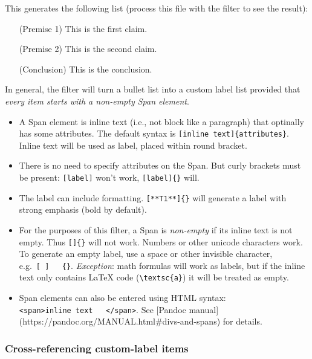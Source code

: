 This generates the following list (process this file with the filter to
see the result):

\begin{itemize}
\tightlist

\item[(Premise 1)] This is the first claim.

\item[(Premise 2)] This is the second claim.

\item[(Conclusion)] This is the conclusion.

\end{itemize}

In general, the filter will turn a bullet list into a custom label list
provided that \emph{every item starts with a non-empty Span element}.

\begin{itemize}
\tightlist
\item
  A Span element is inline text (i.e., not block like a paragraph) that
  optinally has some attributes. The default syntax is
  \texttt{{[}inline\ text{]}\{attributes\}}. Inline text will be used as
  label, placed within round bracket.
\item
  There is no need to specify attributes on the Span. But curly brackets
  must be present: \texttt{{[}label{]}} won't work,
  \texttt{{[}label{]}\{\}} will.
\item
  The label can include formatting. \texttt{{[}**T1**{]}\{\}} will
  generate a label with strong emphasis (bold by default).
\item
  For the purposes of this filter, a Span is \emph{non-empty} if its
  inline text is not empty. Thus \texttt{{[}{]}\{\}} will not work.
  Numbers or other unicode characters work. To generate an empty label,
  use a space or other invisible character,
  e.g.~\texttt{{[}\ {]}\ \ \ \{\}}. \emph{Exception}: math formulas will
  work as labels, but if the inline text only contains LaTeX code
  (\texttt{\textbackslash{}textsc\{a\}}) it will be treated as empty.
\item
  Span elements can also be entered using HTML syntax:
  \texttt{\textless{}span\textgreater{}inline\ text\ \ \ \textless{}/span\textgreater{}}.
  See {[}Pandoc manual{]}
  (https://pandoc.org/MANUAL.html\#divs-and-spans) for details.
\end{itemize}

\hypertarget{cross-referencing-custom-label-items}{%
\subsubsection{Cross-referencing custom-label
items}\label{cross-referencing-custom-label-items}}

